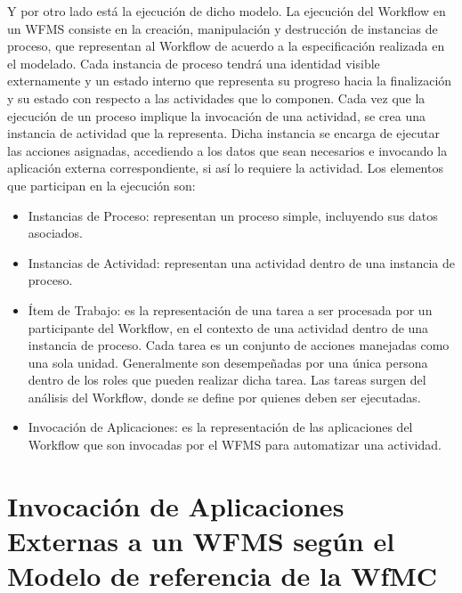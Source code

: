 Y por otro lado está la ejecución de dicho modelo. La ejecución del Workflow en un WFMS consiste en la creación, manipulación y destrucción de instancias de proceso, que representan al Workflow de acuerdo a la especificación realizada en el modelado. Cada instancia de proceso tendrá una identidad visible externamente y un estado interno que representa su progreso hacia la finalización y su estado con respecto a las actividades que lo componen. Cada vez que la ejecución de un proceso implique la invocación de una actividad, se crea una instancia de actividad que la representa. Dicha instancia se encarga de ejecutar las acciones asignadas, accediendo a los datos que sean necesarios e invocando la aplicación externa correspondiente, si así lo requiere la actividad. Los elementos que participan en la ejecución son:

\begin{itemize}
	\item Instancias de Proceso: representan un proceso simple, incluyendo sus datos asociados.
	
	\item Instancias de Actividad: representan una actividad dentro de una instancia de proceso.
	
	\item Ítem de Trabajo: es la representación de una tarea a ser procesada por un participante del Workflow, en el contexto de una actividad dentro de una instancia de proceso. Cada tarea es un conjunto de acciones manejadas como una sola unidad. Generalmente son desempeñadas por una única persona dentro de los roles que pueden realizar dicha tarea. Las tareas surgen del análisis del Workflow, donde se define por quienes deben ser ejecutadas.
	
	\item Invocación de Aplicaciones: es la representación de las aplicaciones del Workflow que son invocadas por el WFMS para automatizar una actividad.
\end{itemize}

\section{Invocación de Aplicaciones Externas a un WFMS según el Modelo de referencia de la WfMC}
\label{Invocación de Aplicaciones Externas a un WFMS según el Modelo de referencia de la WfMC}

